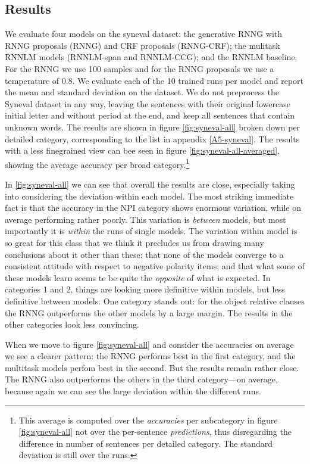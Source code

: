  \subsection{Results}
    We evaluate four models on the syneval dataset: the generative RNNG with RNNG proposals (RNNG) and CRF proposals (RNNG-CRF); the mulitask RNNLM models (RNNLM-span and RNNLM-CCG); and the RNNLM baseline. For the RNNG we use 100 samples and for the RNNG proposals we use a temperature of 0.8. We evaluate each of the 10 trained runs per model and report the mean and standard deviation on the dataset. We do not preprocess the Syneval dataset in any way, leaving the sentences with their original lowercase initial letter and without period at the end, and keep all sentences that contain unknown words. The results are shown in figure \ref{fig:syneval-all} broken down per detailed category, corresponding to the list in appendix \ref{A5-syneval}. The results with a less finegrained view can bee seen in figure \ref{fig:syneval-all-averaged}, showing the average accuracy per broad category.\footnote{This average is computed over the \textit{accuracies} per subcategory in figure \ref{fig:syneval-all} not over the per-sentence \textit{predictions}, thus disregarding the difference in number of sentences per detailed category. The standard deviation is still over the runs.}

    In \ref{fig:syneval-all} we can see that overall the results are close, especially taking into considering the deviation within each model. The most striking immediate fact is that the accuracy in the NPI category shows enormous variation, while on average performing rather poorly. This variation is \textit{between} models, but most importantly it is \textit{within} the runs of single models. The variation within model is so great for this class that we think it precludes us from drawing many conclusions about it other than these: that none of the models converge to a consistent attitude with respect to negative polarity items; and that what some of these models learn seems te be quite the \textit{opposite} of what is expected. In categories 1 and 2, things are looking more definitive within models, but less definitive between models. One category stands out: for the object relative clauses the RNNG outperforms the other models by a large margin. The results in the other categories look less convincing.

    When we move to figure \ref{fig:syneval-all} and consider the accuracies on average we see a clearer pattern: the RNNG performs best in the first category, and the multitask models perfom best in the second. But the results remain rather close. The RNNG also outperforms the others in the third category---on average, because again we can see the large deviation within the different runs.

